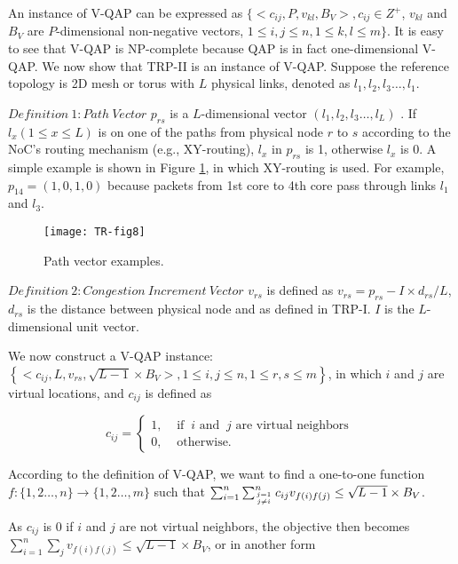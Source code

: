 An instance of V-QAP can be expressed as $\{ <c_{i j}, P, v_{k l}, B_{V}>, c_{i j} \in Z^{+}$, $v_{k l}$ and $B_{V}$ are $P$-dimensional non-negative vectors, $ 1 \leq i, j \leq n, 1 \leq k, l \leq m \}$. It is easy to see that V-QAP is NP-complete because QAP is in fact one-dimensional V-QAP. We now show that TRP-II is an instance of V-QAP. Suppose the reference topology is 2D mesh or torus with $L$ physical links, denoted as  $l_{1}, l_{2}, l_{3} \ldots, l_{1}$. 

$Definition\ 1: Path\ Vector$ $p_{r s}$ is a $L$-dimensional vector $\left(l_{1}, l_{2}, l_{3} \ldots, l_{L}\right)$ . If $l_{x}(1 \leq x \leq L)$ is on one of the paths from physical node $r$ to $s$ according to the NoC’s routing mechanism (e.g., XY-routing), $l_{x}$ in $p_{r s}$ is 1, otherwise $l_{x}$ is 0. A simple example is shown in Figure \ref{fig8}, in which XY-routing is used. For example, $p_{14}=(1,0,1,0)$ because packets from 1st core to 4th core pass through links  $l_{1}$ and $l_{3}$.

\begin{figure}[t]
    \centering
    \texttt{[image: TR-fig8]}
    \caption{Path vector examples.}
    \label{fig8}
\end{figure}

$Definition\ 2: Congestion\ Increment\ Vector$ $v_{r s}$ is defined as $v_{rs}=p_{rs}-I \times d_{rs} / L $, $ d_{rs}$ is the distance between physical node and as defined in TRP-I. $I$ is the $L$-dimensional unit vector.

We now construct a V-QAP instance: \\
$\left\{< c_{i j}, L, v_{r s}, \sqrt{L-1} \times B_{V}>, 1 \leq i, j \leq n, 1 \leq r, s \leq m\right\}$, in which $i$ and $j$ are virtual locations, and $c_{ij}$ is defined as 

$$c_{i j}= \left\{
    \begin{array}{ll}
        1, & \text { if }\ i \text {\ and }\ j \text {\ are\ virtual\ neighbors } \\ 
        0, & \text { otherwise. }
    \end{array} \right. $$

According to the definition of V-QAP, we want to find a one-to-one function $f:\{1,2 \ldots, n\} \rightarrow\{1,2 \ldots, m\}$  such that $\sum_{i=1}^{n} \sum_{j=1 \atop j \neq i}^{n} c_{i j} v_{f(i) f(j)} \leq \sqrt{L-1} \times B_{V}$.

As $c_{i j}$ is 0 if $i$  and $j$ are not virtual neighbors, the objective then becomes $\sum_{i=1}^{n} \sum_{j} v_{f(i) f(j)} \leq \sqrt{L-1} \times B_{V}$, or in another form 

